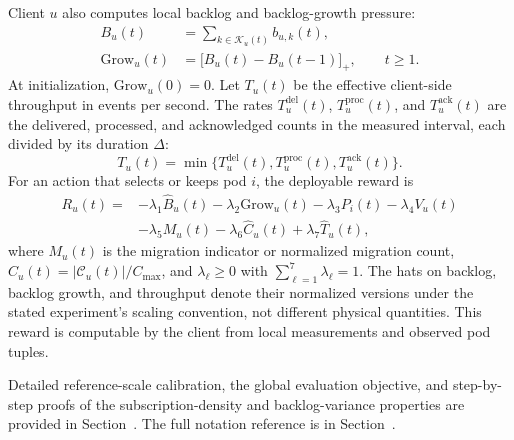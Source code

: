 Client $u$ also computes local backlog and backlog-growth pressure:
\begin{align}
	B_u(t) &= \sum_{k\in\mathcal{K}_u(t)} b_{u,k}(t),\\
	\mathrm{Grow}_u(t) &= \bigl[B_u(t)-B_u(t-1)\bigr]_+,\qquad t\geq1.
\end{align}
At initialization, $\mathrm{Grow}_u(0)=0$. Let $T_u(t)$ be the effective client-side
throughput in events per second. The rates $T^{\mathrm{del}}_u(t)$, $T^{\mathrm{proc}}_u(t)$,
and $T^{\mathrm{ack}}_u(t)$ are the delivered, processed, and acknowledged counts in
the measured interval, each divided by its duration $\Delta$:
\begin{equation}
	T_u(t)=
	\min\{T^{\mathrm{del}}_u(t),T^{\mathrm{proc}}_u(t),T^{\mathrm{ack}}_u(t)\}.
\end{equation}
For an action that selects or keeps pod $i$, the deployable reward is
\begin{align}
	R_u(t)=
	&-\lambda_1\widehat{B}_u(t)
	-\lambda_2\widehat{\mathrm{Grow}}_u(t)
	-\lambda_3 P_i(t)
	-\lambda_4 V_u(t) \nonumber\\
	&-\lambda_5 M_u(t)
	-\lambda_6\widehat{C}_u(t)
	+\lambda_7\widehat{T}_u(t),
	\label{eq:deployable_reward}
\end{align}
where $M_u(t)$ is the migration indicator or normalized migration count,
$\widehat{C}_u(t)=|\mathcal{C}_u(t)|/C_{\max}$, and
$\lambda_\ell\geq0$ with $\sum_{\ell=1}^{7}\lambda_\ell=1$.
The hats on backlog, backlog growth, and throughput denote their normalized
versions under the stated experiment's scaling convention, not different
physical quantities. This reward is computable by the client from
local measurements and observed pod tuples.

Detailed reference-scale calibration, the global evaluation objective, and
step-by-step proofs of the subscription-density and backlog-variance
properties are provided in Section~. The full notation reference is in
Section~.
